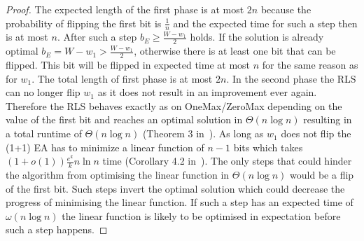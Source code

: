 \begin{proof}
    The expected length of the first phase is at most $2n$ because the probability of flipping the first bit is $\frac{1}{n}$ and the expected time for such a step then is at most $n$.
    After such a step $b_E \ge \frac {W-w_1}{2}$ holds.
    If the solution is already optimal $b_E = W-w_1>\frac {W-w_1}{2}$, otherwise there is at least one bit that can be flipped.
    This bit will be flipped in expected time at most $n$ for the same reason as for $w_1$.
    The total length of first phase is at most $2n$.
    In the second phase the RLS can no longer flip $w_1$ as it does not result in an improvement ever again.
    Therefore the RLS behaves exactly as on OneMax/ZeroMax depending on the value of the first bit and reaches an optimal solution in $\Theta(n\log{}n)$ resulting in a total runtime of $\Theta(n\log{}n)$ (Theorem 3 in~\cite{witt2014fitness}).\newline
    As long as $w_1$ does not flip the (1+1) EA has to minimize a linear function of $n-1$ bits which takes $(1+o(1))\frac{e^k}{k}n\ln n$ time (Corollary 4.2 in~\cite{witt2013tight}).
    The only steps that could hinder the algorithm from optimising the linear function in $\Theta(n\log{}n)$ would be a flip of the first bit.
    Such steps invert the optimal solution which could decrease the progress of minimising the linear function.
    If such a step has an expected time of $\omega(n\log{}n)$ the linear function is likely to be optimised in expectation before such a step happens.

\end{proof}

